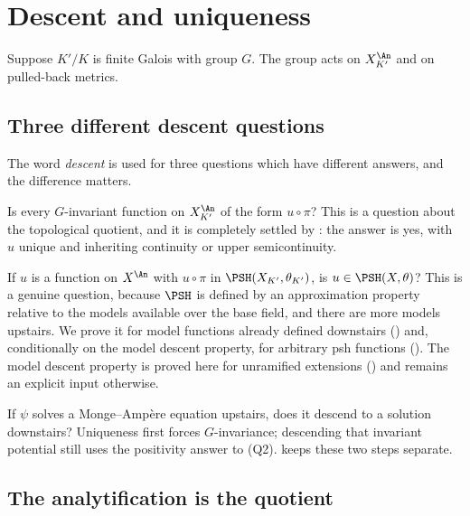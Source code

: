 \section{Descent and uniqueness}
\label{sec:ch30-descent}

Suppose $K'/K$ is finite Galois with group $G$.  The group acts on
$X_{K'}^{\An}$ and on pulled-back metrics.

\subsection{Three different descent questions}
\label{sec:ch30-descent-questions}

The word \emph{descent} is used for three questions which have different
answers, and the difference matters.

\begin{description}[style=nextline,leftmargin=0pt,labelindent=0pt,
  labelsep=0pt,itemsep=.5\baselineskip,font=\normalfont\itshape]
\item[(Q1) Functions.]
Is every $G$-invariant function on $X_{K'}^{\An}$ of the form
$u\circ\pi$?  This is a question about the topological quotient, and it is
completely settled by : the answer is yes,
with $u$ unique and inheriting continuity or upper semicontinuity.

\item[(Q2) Positivity.]
If $u$ is a function on $X^{\An}$ with $u\circ\pi$ in
$\PSH(X_{K'},\theta_{K'})$, is $u\in\PSH(X,\theta)$?  This is a genuine
question, because $\PSH$ is defined by an approximation property relative
to the models available over the base field, and there are more models
upstairs.  We prove it for model functions already defined downstairs
() and, conditionally on the model
descent property, for arbitrary psh functions
().  The model descent property is
proved here for unramified extensions ()
and remains an explicit input otherwise.

\item[(Q3) Solutions.]
If $\psi$ solves a Monge--Amp\`ere equation upstairs, does it descend to a
solution downstairs?  Uniqueness first forces $G$-invariance; descending
that invariant potential still uses the positivity answer to (Q2).
 keeps these two steps separate.
\end{description}

\subsection{The analytification is the quotient}
\label{sec:ch30-galois-quotient}

